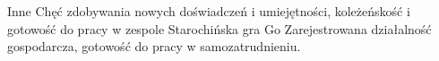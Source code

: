 \begin{rubric}{Inne}
Chęć zdobywania nowych doświadczeń i umiejętności, koleżeńskość i gotowość do pracy w zespole
\entry*[Hobby]
Starochińska gra Go
Zarejestrowana działalność gospodarcza, gotowość do pracy w samozatrudnieniu.
\end{rubric}

